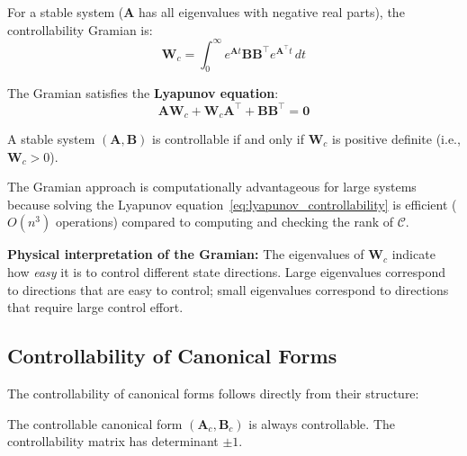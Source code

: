 \begin{definition}
For a stable system ($\mathbf{A}$ has all eigenvalues with negative real parts), the controllability Gramian is:
\begin{equation}
\mathbf{W}_c = \int_0^\infty e^{\mathbf{A}t}\mathbf{B}\mathbf{B}^\top e^{\mathbf{A}^\top t}\,dt
\label{eq:controllability_gramian}
\end{equation}
\end{definition}

The Gramian satisfies the \textbf{Lyapunov equation}:
\begin{equation}
\mathbf{A}\mathbf{W}_c + \mathbf{W}_c\mathbf{A}^\top + \mathbf{B}\mathbf{B}^\top = \mathbf{0}
\label{eq:lyapunov_controllability}
\end{equation}

\begin{theorem}
A stable system $(\mathbf{A}, \mathbf{B})$ is controllable if and only if $\mathbf{W}_c$ is positive definite (i.e., $\mathbf{W}_c > 0$).
\end{theorem}

The Gramian approach is computationally advantageous for large systems because solving the Lyapunov equation~\eqref{eq:lyapunov_controllability} is efficient ($O(n^3)$ operations) compared to computing and checking the rank of $\mathcal{C}$.

\textbf{Physical interpretation of the Gramian:} The eigenvalues of $\mathbf{W}_c$ indicate how \textit{easy} it is to control different state directions. Large eigenvalues correspond to directions that are easy to control; small eigenvalues correspond to directions that require large control effort.

\subsection{Controllability of Canonical Forms}

The controllability of canonical forms follows directly from their structure:

\begin{theorem}
The controllable canonical form $(\mathbf{A}_c, \mathbf{B}_c)$ is always controllable. The controllability matrix has determinant $\pm 1$.
\end{theorem}

